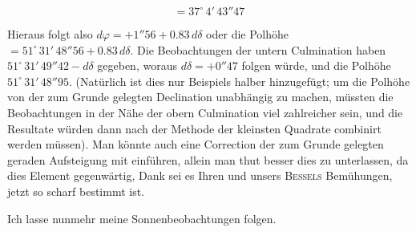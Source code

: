 \[ = 37^\circ\,4'\,43''47 \]

\par\indent Hieraus folgt also $d\varphi = +1''56 + 0.83\,d\delta$ oder die Polhöhe $= 51^\circ\,31'\,48''56 + 0.83\,d\delta$. Die Beobachtungen der untern Culmination haben $51^\circ\,31'\,49''42 - d\delta$ gegeben, woraus $d\delta = +0''47$ folgen würde, und die Polhöhe $51^\circ\,31'\,48''95$. (Natürlich ist dies nur Beispiels halber hinzugefügt; um die Polhöhe von der zum Grunde gelegten Declination unabhängig zu machen, müssten die Beobachtungen in der Nähe der obern Culmination viel zahlreicher sein, und die Resultate würden dann nach der Methode der kleinsten Quadrate combinirt werden müssen). Man könnte auch eine Correction der zum Grunde gelegten geraden Aufsteigung mit einführen, allein man thut besser dies zu unterlassen, da dies Element gegenwärtig, Dank sei es Ihren und unsers \textsc{Bessels} Bemühungen, jetzt so scharf bestimmt ist.

\par\indent Ich lasse nunmehr meine Sonnenbeobachtungen folgen.

